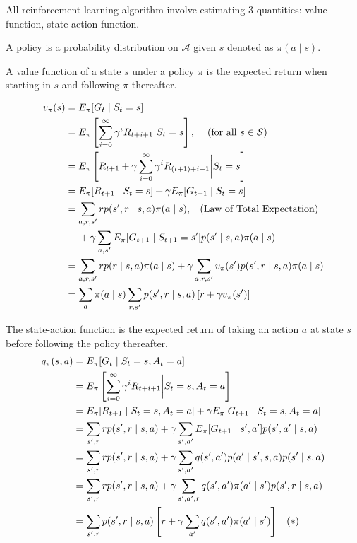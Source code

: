 \documentclass[twocolumn, 10pt]{article}
\newcommand{\actionset}{ \mathcal{A}}
\newcommand{\stateset}{\mathcal{S}}
\newcommand{\Mid}{ \bigg|}
\begin{document}
	All reinforcement learning algorithm involve estimating 3 quantities: value function, state-action function.
	
	A policy is a probability distribution on $\actionset$ given $s$ denoted as  $\pi (a \mid s)$.
	
	A value function of a state $s$ under a policy $\pi$ is the expected return when starting in  $s$ and following $\pi$ thereafter.
	
	$$ 
	\begin{aligned}
	v_{\pi}(s) &= E_{\pi} [G_t \mid S_t = s]  \\
	&=  E_{\pi} \left[ \sum^{\infty}_{i=0}  \gamma^i R_{t + i + 1} \Mid S_t = s \right],  \hspace{2ex} \mbox{ (for all } s \in \stateset)  \\
	&=  E_{\pi} \left[ R_{t+1} + \gamma \sum^{\infty}_{i=0} \gamma^i R_{(t+1) + i + 1} \Mid S_t = s \right] \\
	&=  E_{\pi} [ R_{t+1} \mid S_t = s]  + \gamma  E_{\pi} [ G_{t+1} \mid S_t = s ] \\
	&=  \sum_{a, r, s'} r p(s',  r \mid s , a) \pi(a \mid s) , \hspace{2ex} \mbox{(Law of Total Expectation)} \\ 
	&\hspace{3ex} +  \gamma  \sum_{a, s'} E_{\pi}[G_{t + 1} \mid S_{t+1} = s'] p(s' \mid s, a)  \pi (a \mid s)  \\
	&=  \sum_{a, r, s'} r p( r \mid s , a) \pi(a \mid s)  +  \gamma  \sum_{a, r, s'} v_{\pi}(s')  p(s'
	, r \mid s, a)  \pi (a \mid s)  \\
	&= \sum_{a} \pi(a \mid s)  \sum_{r, s'}   p(s', r \mid s, a)   \left[ r  + \gamma  v_{\pi}(s')  \right]
	\end{aligned}
	$$
	
	The state-action function is the expected return  of taking an action $a$ at state $s$ before following the policy thereafter.
	$$
	\begin{aligned}
	q_{\pi}(s, a) &= E_{\pi} [G_t \mid S_t = s, A_t = a]  \\
	&= E_{\pi} \left[ \sum^{\infty}_{i=0}  \gamma^i R_{t + i + 1}  \Mid S_t = s , A_t = a\right]  \\
	&= E_{\pi} [R_{t+1} \mid S_t = s, A_t =  a] + \gamma E_{\pi} [ G_{t+1} \mid S_t = s, A_t =  a] \\
	&=  \sum_{s', r} r p(s', r  \mid s, a) + \gamma \sum_{s', a'} E_{\pi} [G_{t+1} \mid s', a'] p(s', a' \mid s, a) \\
	&=  \sum_{s', r} r p(s', r  \mid s, a) + \gamma \sum_{s', a'} q(s', a') p( a' \mid s',  s, a) p(s' \mid  s, a) \\
	&=  \sum_{s', r} r p(s', r  \mid s, a) + \gamma \sum_{s', a', r} q(s', a') \pi(a' \mid s')  p(s', r \mid  s, a) \\
	&=  \sum_{s', r}  p(s', r  \mid s, a) \left [ r + \gamma \sum_{a'} q(s', a') \pi(a' \mid s')  \right]   \hspace{2ex} (*) 
	\end{aligned}
	$$
	
\end{document}

